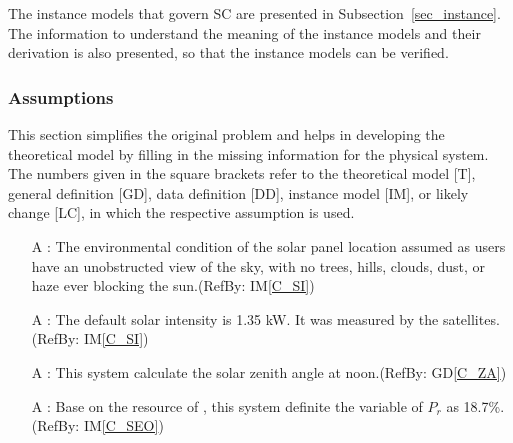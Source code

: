 \documentclass[12pt]{article}
\newcommand{\dref}[1]{GD\ref{#1}}
\newcounter{assumpnum} %
\newcommand{\iref}[1]{IM\ref{#1}}
\begin{document}
The instance models that govern SC are presented in
Subsection~\ref{sec_instance}.  The information to understand the meaning of the
instance models and their derivation is also presented, so that the instance
models can be verified.

\subsubsection{Assumptions} \label{sec_assumpt}

This section simplifies the original problem and helps in developing the
theoretical model by filling in the missing information for the physical
system. The numbers given in the square brackets refer to the theoretical model
[T], general definition [GD], data definition [DD], instance model [IM], or
likely change [LC], in which the respective assumption is used.

\begin{itemize}

\item[A\refstepcounter{assumpnum}\theassumpnum \label{environmentCondition}]: The environmental condition of the solar panel location assumed as users have an unobstructed view of the sky, with no trees, hills, clouds, dust, or haze ever blocking the sun.(RefBy: \iref{C_SI})\\

\item[A\refstepcounter{assumpnum}\theassumpnum \label{a_dsip}]: The default solar intensity is 1.35 kW. It was measured by the satellites.(RefBy: \iref{C_SI})\\

\item[A\refstepcounter{assumpnum}\theassumpnum \label{a_dsia}]: This system calculate the solar zenith angle at noon.(RefBy: \dref{C_ZA})\\

\item[A\refstepcounter{assumpnum}\theassumpnum \label{a_dp}]: Base
 on the resource of \cite{EMPA2011}, this system definite the variable of $P_r$ as 18.7\%.(RefBy: \iref{C_SEO})\\

\end{itemize}
\end{document}
